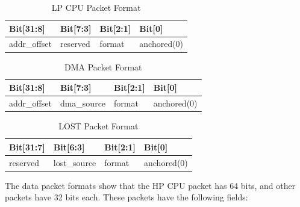 \documentclass[main\_\_EN.tex]{subfiles}
\begin{document}
    \begin{longtable}[c]{|L{3cm}|L{3cm}|L{3cm}|l|}
        \caption{LP CPU Packet Format}\label{tab:dbgassist-lpcpu-package}
        \\\hline
        \textbf{Bit[31:8]} & \textbf{Bit[7:3]} & \textbf{Bit[2:1]} & \textbf{Bit[0]} \\\hline
        addr\_offset & reserved & format & anchored(0) \\\hline
    \end{longtable}

    \begin{longtable}[c]{|L{3cm}|L{3cm}|L{3cm}|l|}
        \caption{DMA Packet Format}\label{tab:dbgassist-dma-package}
        \\\hline
        \textbf{Bit[31:8]} & \textbf{Bit[7:3]} & \textbf{Bit[2:1]} & \textbf{Bit[0]} \\\hline
        addr\_offset & dma\_source & format & anchored(0) \\\hline
    \end{longtable}
    
    \begin{longtable}[c]{|L{3cm}|L{3cm}|L{3cm}|l|}
        \caption{LOST Packet Format}\label{tab:dbgassist-lost-package}
        \\\hline
        \textbf{Bit[31:7]} & \textbf{Bit[6:3]} & \textbf{Bit[2:1]} & \textbf{Bit[0]} \\\hline
        reserved & lost\_source & format & anchored(0) \\\hline
    \end{longtable}

The data packet formats show that the HP CPU packet has 64 bits, and other packets have 32 bits each. These packets have the following fields:
\end{document}
